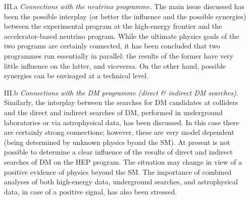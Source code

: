 \begin{enumerate}
\item[III.a] {\em Connections with the neutrino programme.} 
The main issue discussed has been the possible interplay (or better the influence and the possible synergies) between
the experimental program at the high-energy frontier and the accelerator-based neutrino program. 
While the ultimate physics goals of the two programs are certainly connected, it has been concluded that two programmes 
run essentially in parallel: the results of the former have very little influence on the latter, and viceversa. On the other hand,
possible synergies can be envisaged at a technical level. 

\item[III.b] {\em Connections with the DM programme (direct \& indirect DM searches).} 
Similarly,  the interplay between the searches for DM candidates at colliders 
and the direct and indirect searches of DM, performed in underground laboratories 
or via astrophysical data,  has been discussed. 
In this case there are certainly strong connections;  however, these are very model dependent
(being determined by unknown physics byond the SM). 
At present is not possible to determine a clear influence of the results of 
direct and indirect searches of DM on the HEP program. The situation may change in view of a positive evidence of physics beyond the SM. 
The importance of combined analyses of both high-energy data, underground searches, and astrophysical data,
in case of a positive signal, has also been stressed.

\end{enumerate}
